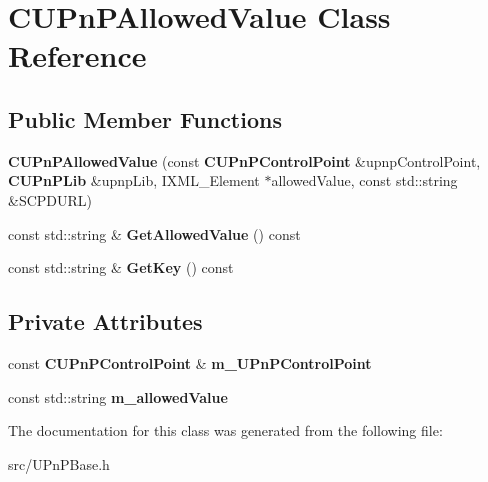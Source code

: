 \section{CUPnPAllowedValue Class Reference}
\label{classCUPnPAllowedValue}
\subsection*{Public Member Functions}
\begin{DoxyCompactItemize}
\item 
{\bfseries CUPnPAllowedValue} (const {\bf CUPnPControlPoint} \&upnpControlPoint, {\bf CUPnPLib} \&upnpLib, IXML\_\-Element $\ast$allowedValue, const std::string \&SCPDURL)\label{classCUPnPAllowedValue_a7adf714092534aae16fde77b2698fbc0}

\item 
const std::string \& {\bfseries GetAllowedValue} () const \label{classCUPnPAllowedValue_a41c6ca92b34d44c2828abfaf9b1120f0}

\item 
const std::string \& {\bfseries GetKey} () const \label{classCUPnPAllowedValue_aa4f331613737accf2095fa1567632bd1}

\end{DoxyCompactItemize}
\subsection*{Private Attributes}
\begin{DoxyCompactItemize}
\item 
const {\bf CUPnPControlPoint} \& {\bfseries m\_\-UPnPControlPoint}\label{classCUPnPAllowedValue_aaf5b04370077714bcd260a959a515931}

\item 
const std::string {\bfseries m\_\-allowedValue}\label{classCUPnPAllowedValue_affda027b5641cc54311d54e8753a3692}

\end{DoxyCompactItemize}


The documentation for this class was generated from the following file:\begin{DoxyCompactItemize}
\item 
src/UPnPBase.h\end{DoxyCompactItemize}
